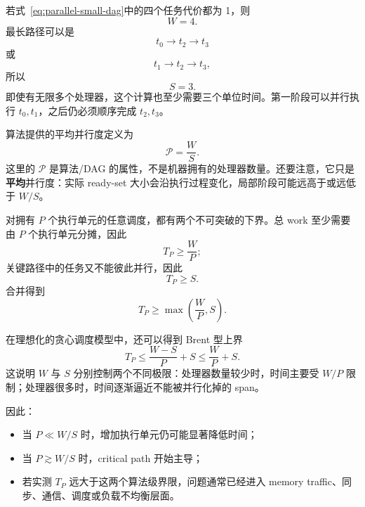 若式~\eqref{eq:parallel-small-dag}中的四个任务代价都为 1，则
\begin{equation}
W=4.
\end{equation}
最长路径可以是
\begin{equation}
t_0\rightarrow t_2\rightarrow t_3
\end{equation}
或
\begin{equation}
t_1\rightarrow t_2\rightarrow t_3,
\end{equation}
所以
\begin{equation}
S=3.
\end{equation}
即使有无限多个处理器，这个计算也至少需要三个单位时间。第一阶段可以并行执行 $t_0,t_1$，之后仍必须顺序完成 $t_2,t_3$。

算法提供的平均并行度定义为
\begin{equation}
\boxed{
\mathcal P=\frac{W}{S}.
}
\label{eq:parallel-average-parallelism}
\end{equation}
这里的 $\mathcal P$ 是算法/DAG 的属性，不是机器拥有的处理器数量。还要注意，它只是\textbf{平均}并行度：实际 ready-set 大小会沿执行过程变化，局部阶段可能远高于或远低于 $W/S$。

对拥有 $P$ 个执行单元的任意调度，都有两个不可突破的下界。总 work 至少需要由 $P$ 个执行单元分摊，因此
\begin{equation}
T_P\ge\frac{W}{P};
\end{equation}
关键路径中的任务又不能彼此并行，因此
\begin{equation}
T_P\ge S.
\end{equation}
合并得到
\begin{equation}
\boxed{
T_P\ge\max\left(\frac{W}{P},S\right).
}
\label{eq:parallel-lower-bound}
\end{equation}

在理想化的贪心调度模型中，还可以得到 Brent 型上界
\begin{equation}
T_P
\le
\frac{W-S}{P}+S
\le
\frac{W}{P}+S.
\label{eq:parallel-brent-bound}
\end{equation}
这说明 $W$ 与 $S$ 分别控制两个不同极限：处理器数量较少时，时间主要受 $W/P$ 限制；处理器很多时，时间逐渐逼近不能被并行化掉的 span。

因此：
\begin{itemize}
\item 当 $P\ll W/S$ 时，增加执行单元仍可能显著降低时间；
\item 当 $P\gtrsim W/S$ 时，critical path 开始主导；
\item 若实测 $T_P$ 远大于这两个算法级界限，问题通常已经进入 memory traffic、同步、通信、调度或负载不均衡层面。
\end{itemize}

